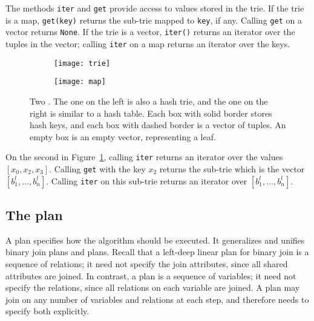 The methods \lstinline|iter| and \lstinline|get|
provide access to values stored in the trie.
If the trie is a map,
\lstinline|get(key)| returns the sub-trie mapped to \lstinline|key|,
if any.
Calling \texttt{get} on a vector returns \lstinline|None|.
If the trie is a vector,
\lstinline|iter()|
returns an iterator over the tuples in the vector;
calling \texttt{iter} on a map
returns an iterator over the keys.

\begin{figure}
  \centering
  \begin{subfigure}[c]{0.3\linewidth}
    \texttt{[image: trie]}
  \end{subfigure}\hspace{1.5cm}%
  \begin{subfigure}[c]{0.3\linewidth}
    \texttt{[image: map]}
  \end{subfigure}
  \caption{
    Two \GHTs. The one on the left is also a hash trie,
    and the one on the right is similar to a hash table.
    Each box with solid border stores hash keys,
    and each box with dashed border is a vector of tuples.
    An empty box is an empty vector, representing a leaf.
  }
  \label{fig:ght-examples}
\end{figure}

\begin{example}
  On the second \GHT in Figure~\ref{fig:ght-examples},
  calling \texttt{iter} returns an
  iterator over the values $[x_0, x_2, x_3]$.
  Calling \texttt{get} with the key $x_2$
  returns the sub-trie which is the vector $[b_1^l, \ldots, b_n^l]$.
  Calling \texttt{iter} on this sub-trie
  returns an iterator over $[b_1^l, \ldots, b_n^l]$.
\end{example}


\subsection{The \FJ plan}\label{sec:fj-plan}


A \FJ plan specifies how the \FJ algorithm should be executed.
It generalizes and unifies binary join plans and \GJ plans.
Recall that a left-deep linear plan for binary join
is a sequence of relations;
it need not specify the join attributes,
since all shared attributes are joined.
In contrast, a \GJ plan is a sequence of variables;
it need not specify the relations,
since all relations on each variable are joined.
A \FJ plan may join on any number of variables and relations at each step,
and therefore needs to specify both explicitly.

